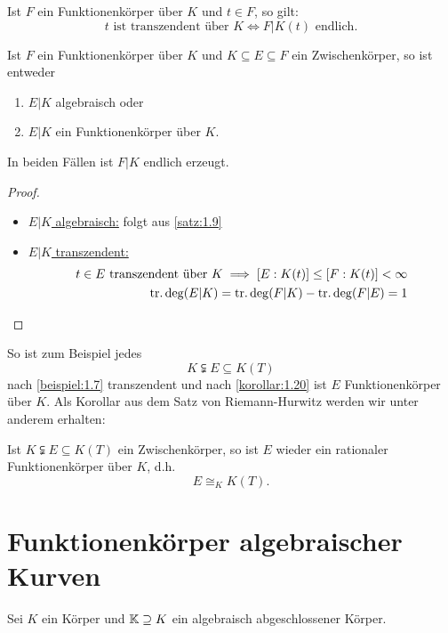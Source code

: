 \begin{korollar}
    Ist $F$ ein Funktionenkörper über $K$ und $t \in F$, so gilt:
    $$ t \text{ ist transzendent über } K \iff F|K(t) \text{ endlich}.$$ 
\end{korollar}
\begin{korollar}\label{korollar:1.20}
    Ist $F$ ein Funktionenkörper über $K$ und $K \subseteq E \subseteq F$ ein Zwischenkörper, so ist entweder
    \begin{enumerate}[label=(\arabic*)]
        \item $E|K$ algebraisch oder
        \item $E|K$ ein Funktionenkörper über $K$.
    \end{enumerate}
    In beiden Fällen ist $F|K$ endlich erzeugt.
\end{korollar}
\begin{proof}
    \begin{itemize}[label=]
        \item \underline{$E|K$ algebraisch:}
        folgt aus \cref{satz:1.9}
        \item \underline{$E|K$ transzendent:}
        \begin{align*}
            t \in E \text{ transzendent über } K \implies [E:K(t)] \leq [F:K(t)] < \infty\\
            \operatorname{tr.deg}(E|K) = \operatorname{tr.deg}(F|K) - \operatorname{tr.deg}(F|E) = 1
        \end{align*}
    \end{itemize}
\end{proof}

\begin{bemerkungnr}
    So ist zum Beispiel jedes $$ K \subsetneqq E \subseteq K(T)$$
    nach \cref{beispiel:1.7} transzendent und nach \cref{korollar:1.20} ist $E$ Funktionenkörper
    über $K$. Als Korollar aus dem Satz von Riemann-Hurwitz werden wir unter anderem erhalten:
\end{bemerkungnr}
\begin{theorem}[Lüroth, 1875]
    Ist $K \subsetneqq E \subseteq K(T)$ ein Zwischenkörper, so ist $E$ wieder ein rationaler Funktionenkörper über $K$,
    d.h.
    $$ E \cong_K K(T). $$
\end{theorem}

\section{Funktionenkörper algebraischer Kurven}
Sei $K$ ein Körper und $\mathbb{K} \supseteq K$ ein algebraisch abgeschlossener Körper.

